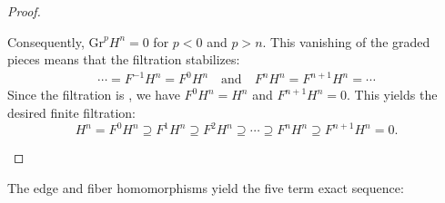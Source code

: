 \begin{proof}
\begin{enumerate}
        Consequently, $\text{Gr}^p H^n = 0$ for $p < 0$ and $p > n$. This vanishing of the graded pieces means that the filtration stabilizes:
        \begin{align*}
            \cdots = F^{-1} H^n = F^0 H^n \quad \text{and} \quad F^n H^n = F^{n+1} H^n = \cdots
        \end{align*}
        Since the filtration is , we have $F^0 H^n = H^n$ and $F^{n+1} H^n = 0$. This yields the desired finite filtration:
        $$H^n = F^0 H^n \supseteq F^1 H^n \supseteq F^2 H^n \supseteq \cdots \supseteq F^n H^n \supseteq F^{n+1} H^n = 0.$$
    \end{enumerate}
    
\end{proof}















The edge and fiber homomorphisms yield the five term exact sequence:











